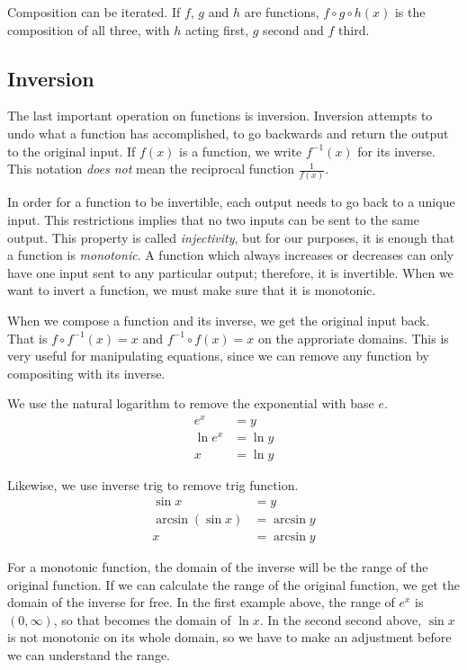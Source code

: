 \documentclass[fleqn]{report}
\begin{document}
Composition can be iterated. If $f$, $g$ and $h$ are
functions, $f \circ g \circ h(x)$ is the composition of all
three, with $h$ acting first, $g$ second and $f$ third. 

\subsection{Inversion}
\label{inversion}

The last important operation on functions is inversion.
Inversion attempts to undo what a function has accomplished,
to go backwards and return the output to the original input.
If $f(x)$ is a function, we write $f^{-1}(x)$ for its inverse.
This notation \emph{does not} mean the reciprocal function
$\frac{1}{f(x)}$. 

In order for a function to be invertible, each output needs to
go back to a unique input. This restrictions implies that  no
two inputs can be sent to the same output. This property is
called \emph{injectivity}, but for our purposes, it is enough
that a function is \emph{monotonic}. A function which always
increases or decreases can only have one input sent to any
particular output; therefore, it is invertible.  When we want
to invert a function, we must make sure that it is monotonic.

When we compose a function and its inverse, we get the
original input back. That is $f \circ f^{-1}(x) = x$ and
$f^{-1} \circ f(x) = x$ on the approriate domains. This is
very useful for manipulating equations, since we can remove
any function by compositing with its inverse. 

\begin{example}
We use the natural logarithm to remove the exponential with
base $e$.
\begin{align*}
e^x & = y \\
\ln e^x & = \ln y \\
x & = \ln y
\end{align*}
\end{example}

\begin{example}
Likewise, we use inverse trig to remove trig function.
\begin{align*}
\sin x & = y \\
\arcsin (\sin x) &= \arcsin y \\
x & = \arcsin y
\end{align*}
\end{example}

For a monotonic function, the domain of the inverse will be
the range of the original function. If we can calculate the
range of the original function, we get the domain of the
inverse for free. In the first example above, the range of
$e^x$ is $(0,\infty)$, so that becomes the domain of $\ln x$.
In the second second above, $\sin x$ is not monotonic on its
whole domain, so we have to make an adjustment before we can
understand the range. 
\end{document}
